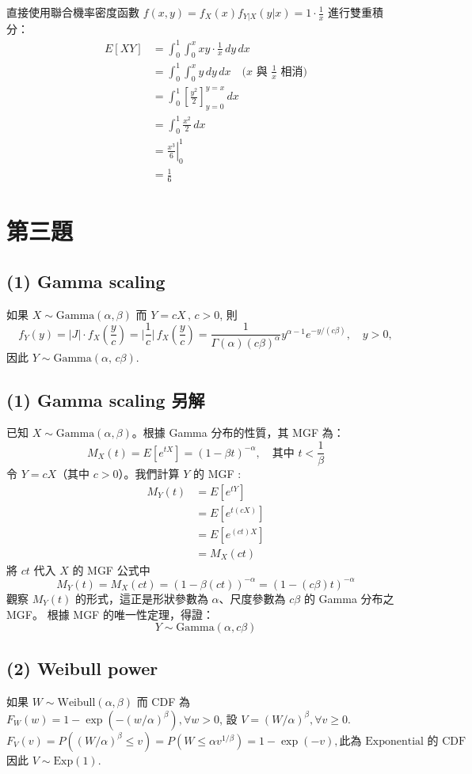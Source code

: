 \documentclass{article}
\begin{document}
直接使用聯合機率密度函數 $f(x,y) = f_X(x)f_{Y|X}(y|x) = 1 \cdot \frac{1}{x}$ 進行雙重積分：
\begin{align*}
E[XY] &= \int_0^1 \int_0^x xy \cdot \frac{1}{x} \, dy \, dx \\
&= \int_0^1 \int_0^x y \, dy \, dx \quad \text{($x$ 與 $\frac{1}{x}$ 相消)} \\
&= \int_0^1 \left[ \frac{y^2}{2} \right]_{y=0}^{y=x} \, dx \\
&= \int_0^1 \frac{x^2}{2} \, dx \\
&= \left. \frac{x^3}{6} \right|_0^1 \\
&= \boxed{\frac{1}{6}}
\end{align*}

\hrulefill

\section*{第三題}
\subsection*{(1) Gamma scaling} 
如果 $X\sim \mathrm{Gamma}(\alpha,\beta)$ 而 $Y=cX \, ,\,  c>0$, 則
\[
f_Y(y)=|J| \cdot f_X\!\left(\frac{y}{c}\right) = 
\bigg| \frac1c \bigg| \,f_X\!\left(\frac{y}{c}\right)
=\frac{1}{\Gamma(\alpha)(c\beta)^\alpha}y^{\alpha-1}e^{-y/(c\beta)},\quad y>0,
\]
因此 $Y\sim \mathrm{Gamma}(\alpha,\,c\beta)$.

\subsection*{(1) Gamma scaling 另解}
已知 $X \sim \mathrm{Gamma}(\alpha, \beta)$。根據 Gamma 分布的性質，其 MGF 為：
\[
M_X(t) = E[e^{tX}] = (1 - \beta t)^{-\alpha}, \quad \text{其中 } t < \frac{1}{\beta}
\]
令 $Y = cX$（其中 $c > 0$）。我們計算 $Y$ 的 MGF :
\begin{align*}
M_Y(t) &= E[e^{tY}] \\
&= E[e^{t(cX)}] \\
&= E[e^{(ct)X}] \\
&= M_X(ct)
\end{align*}
將 $ct$ 代入 $X$ 的 MGF 公式中
\[
M_Y(t) = M_X(ct) = (1 - \beta(ct))^{-\alpha} = \left(1 - (c\beta)t\right)^{-\alpha}
\]
觀察 $M_Y(t)$ 的形式，這正是形狀參數為 $\alpha$、尺度參數為 $c\beta$ 的 Gamma 分布之 MGF。
根據 MGF 的唯一性定理，得證：
\[
Y \sim \mathrm{Gamma}(\alpha, c\beta)
\]
\subsection*{(2) Weibull power} 
如果 $W\sim \mathrm{Weibull}(\alpha,\beta)$ 而 CDF 為
$F_W(w)=1-\exp\!(-(w/\alpha)^\beta) , \forall w>0$, 設 $V=(W/\alpha)^\beta , \forall v\ge 0$.
\[
F_V(v)=P\!\left((W/\alpha)^\beta\le v\right)=P\!\left(W\le \alpha v^{1/\beta}\right)
=1-\exp(-v), \text{此為 Exponential 的 CDF}
\]
因此 $V\sim \mathrm{Exp}(1)$.
\end{document}
